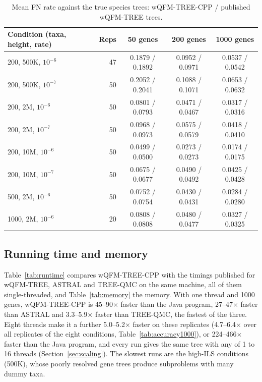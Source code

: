 \documentclass[11pt,a4paper]{article}
\newcommand{\wqfmtree}{wQFM-TREE}
\newcommand{\cpp}{wQFM-TREE-CPP}
\begin{document}
\begin{table}[t]
\centering\small
\caption{Mean FN rate against the true species trees: \cpp{} / published \wqfmtree{} trees.}
\label{tab:accuracy}
\begin{tabular}{lrccc}
\toprule
Condition (taxa, height, rate) & Reps & 50 genes & 200 genes & 1000 genes \\
\midrule
200, 500K, $10^{-6}$ & 47 & 0.1879 / 0.1892 & 0.0952 / 0.0971 & 0.0537 / 0.0542 \\
200, 500K, $10^{-7}$ & 50 & 0.2052 / 0.2041 & 0.1088 / 0.1071 & 0.0653 / 0.0632 \\
200, 2M, $10^{-6}$   & 50 & 0.0801 / 0.0793 & 0.0471 / 0.0467 & 0.0317 / 0.0316 \\
200, 2M, $10^{-7}$   & 50 & 0.0968 / 0.0973 & 0.0575 / 0.0579 & 0.0418 / 0.0410 \\
200, 10M, $10^{-6}$  & 50 & 0.0499 / 0.0500 & 0.0273 / 0.0273 & 0.0174 / 0.0175 \\
200, 10M, $10^{-7}$  & 50 & 0.0675 / 0.0677 & 0.0490 / 0.0492 & 0.0425 / 0.0428 \\
500, 2M, $10^{-6}$   & 50 & 0.0752 / 0.0754 & 0.0430 / 0.0431 & 0.0284 / 0.0280 \\
1000, 2M, $10^{-6}$  & 20 & 0.0808 / 0.0808 & 0.0480 / 0.0477 & 0.0327 / 0.0325 \\
\bottomrule
\end{tabular}
\end{table}

\subsection{Running time and memory}

Table~\ref{tab:runtime} compares \cpp{} with the timings published for \wqfmtree{}, ASTRAL and
TREE-QMC on the same machine, all of them single-threaded, and Table~\ref{tab:memory} the memory.
With one thread and 1000 genes, \cpp{} is 45--90$\times$ faster than the Java program, 27--47$\times$
faster than ASTRAL and 3.3--5.9$\times$ faster than TREE-QMC, the fastest of the three. Eight threads
make it a further 5.0--5.2$\times$ faster on these replicates (4.7--6.4$\times$ over all replicates of the
eight conditions, Table~\ref{tab:accuracy1000}), or 224--466$\times$ faster than the Java program, and
every run gives the same tree with any of 1 to 16 threads (Section~\ref{sec:scaling}). The slowest runs are the high-ILS
conditions (500K), whose poorly resolved gene trees produce subproblems with many dummy taxa.
\end{document}
